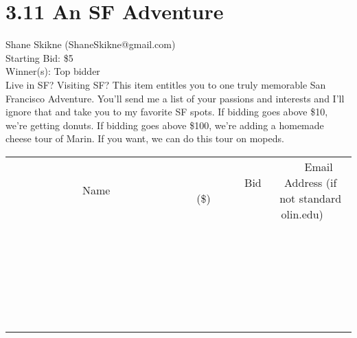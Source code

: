 \documentclass[11pt]{article}
\begin{document}
\section*{3.11 An SF Adventure}
Shane Skikne (ShaneSkikne@gmail.com) \\
Starting Bid: \$5 \\
Winner(s): 
Top bidder \\
Live in SF? Visiting SF? This item entitles you to one truly memorable San Francisco Adventure. You'll send me a list of your passions and interests and I'll ignore that and take you to my favorite SF spots. 
If bidding goes above \$10, we're getting donuts.
If bidding goes above \$100, we're adding a homemade cheese tour of Marin. 
If you want, we can do this tour on mopeds. \\[6ex]
\begin{tabular}{c c c}
~~~~~~~~~~~~~Name~~~~~~~~~~~~~ & ~~~~~~~~~Bid (\$)~~~~~~~~~ & ~~~Email Address (if not standard olin.edu)~~~ \\
 & & \\
\hline
 & & \\
\hline
 & & \\
\hline
 & & \\
\hline
 & & \\
\hline
 & & \\
\hline
 & & \\
\hline
 & & \\
\hline
 & & \\
\hline
 & & \\
\hline
 & & \\
\hline
 & & \\
\hline
 & & \\
\hline
 & & \\
\hline
 & & \\
\hline
 & & \\
\hline
 & & \\
\hline
 & & \\
\hline
 & & \\
\hline
 & & \\
\hline
 & & \\
\hline
 & & \\
\hline
 & & \\
\hline
 & & \\
\hline
 & & \\
\hline
 & & \\
\hline
\end{tabular}
\clearpage
\end{document}
